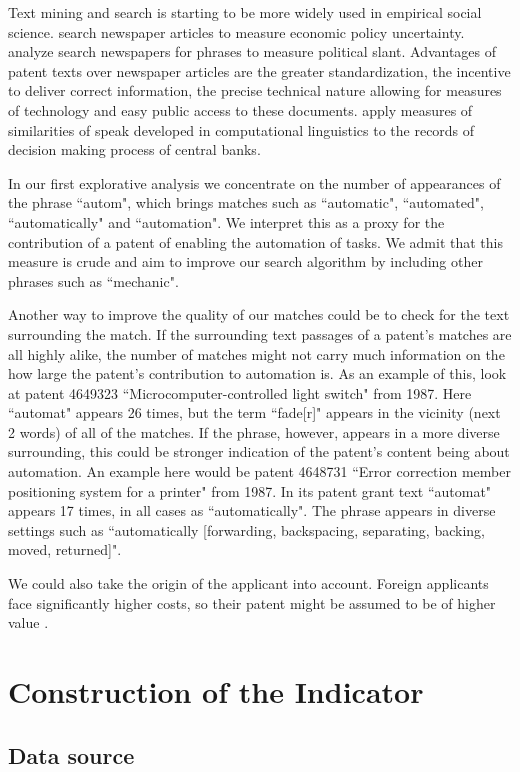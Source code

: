 \documentclass[11pt,a4paper,fleqn]{article}
\begin{document}
Text mining and search is starting to be more widely used in empirical social science. \cite{BBD2013} search newspaper articles to measure economic policy uncertainty. \cite{GS2010} analyze search newspapers  for phrases to measure political slant. Advantages of patent texts over newspaper articles are the greater standardization, the incentive to deliver correct information, the precise technical nature allowing for measures of technology and easy public access to these documents. \cite{HMP2014} apply measures of similarities of speak developed in computational linguistics to the records of decision making process of central banks.

In our first explorative analysis we concentrate on the number of appearances of the phrase ``autom", which brings matches such as ``automatic", ``automated", ``automatically" and ``automation". We interpret this as a proxy for the contribution of a patent of enabling the automation of tasks. We admit that this measure is crude and aim to improve our search algorithm by including other phrases such as ``mechanic".

Another way to improve the quality of our matches could be to check for the text surrounding the match. If the surrounding text passages of a patent's matches are all highly alike, the number of matches might not carry much information on the how large the patent's contribution to automation is. As an example of this, look at patent  4649323 ``Microcomputer-controlled light switch" from 1987. Here ``automat" appears 26 times, but the term ``fade[r]" appears in the vicinity (next 2 words) of all of the matches. If the phrase, however, appears in a more diverse surrounding, this could be stronger indication of the patent's content being about automation. An example here would be patent 4648731 ``Error correction member positioning system for a printer" from 1987. In its patent grant text ``automat" appears 17 times, in all cases as ``automatically". The phrase appears in diverse settings such as ``automatically [forwarding, backspacing,  separating, backing, moved, returned]".

We could also take the origin of the applicant into account. Foreign applicants face significantly higher costs, so their patent might be assumed to be of higher value \citep{HS2005}.


\section{Construction of the Indicator}
\subsection{Data source}
\end{document}
